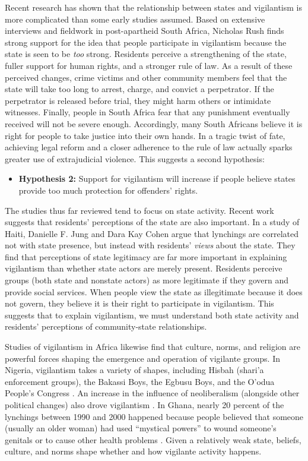 \documentclass[12pt,a4paper]{article}
\begin{document}
Recent research has shown that the relationship between states and vigilantism is more complicated than some early studies assumed. Based on extensive interviews and fieldwork in post-apartheid South Africa, Nicholas Rush \citet{smith2019contradictions} finds strong support for the idea that people participate in vigilantism because the state is seen to be \textit{too} strong. Residents perceive a strengthening of the state, fuller support for human rights, and a stronger rule of law. As a result of these perceived changes, crime victims and other community members feel that the state will take too long to arrest, charge, and convict a perpetrator. If the perpetrator is released before trial, they might harm others or intimidate witnesses. Finally, people in South Africa fear that any punishment eventually received will not be severe enough. Accordingly, many South Africans believe it is right for people to take justice into their own hands. In a tragic twist of fate, achieving legal reform and a  closer adherence to the rule of law actually sparks greater use of extrajudicial violence. This suggests a second hypothesis:

\begin{itemize}
  \item \textbf{Hypothesis 2:} Support for vigilantism will increase if people believe states provide too much protection for offenders' rights. 
  \end{itemize}

The studies thus far reviewed tend to focus on state activity. Recent work suggests that residents' perceptions of the state are also important. In a study of Haiti, Danielle F. Jung and Dara Kay Cohen \citeyearpar[3]{jung2020lynching} argue that lynchings are correlated not with state presence, but instead with residents' \textit{views} about the state. They find that perceptions of state legitimacy are far more important in explaining vigilantism than whether state actors are merely present. Residents perceive groups (both state and nonstate actors) as more legitimate if they govern and provide social services. When people view the state as illegitimate because it does not govern, they believe it is their right to participate in vigilantism. This suggests that to explain vigilantism, we must understand both state activity and residents' perceptions of community-state relationships. 

Studies of vigilantism in Africa likewise find that culture, norms, and religion are powerful forces shaping the emergence and operation of vigilante groups. In Nigeria, vigilantism takes a variety of shapes, including Hisbah (shari'a enforcement groups), the Bakassi Boys, the Egbusu Boys, and the O'odua People's Congress \citep{pratten2008thief,last2008search, fourchard2008new}. An increase in the influence of neoliberalism (alongside other political changes) also drove vigilantism \citep[5]{pratten2008politics}. In Ghana, nearly 20 percent of the lynchings between 1990 and 2000 happened because people believed that someone (usually an older woman) had used ``mystical powers'' to wound someone's genitals or to cause other health problems  \citep[414]{adinkrah2005vigilante}. Given a relatively weak state, beliefs, culture, and norms shape whether and how vigilante activity happens.  
\end{document}
